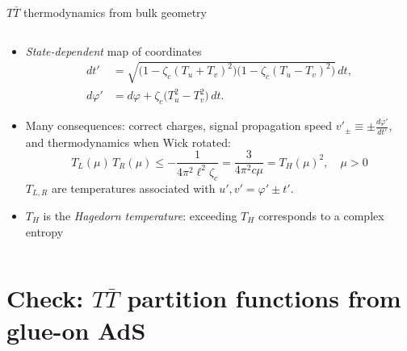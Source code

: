 \documentclass[
	10pt
	,noamsthm
]{beamer}
\newcommand{\TTbar}{\texorpdfstring{\ensuremath{T\bar{T}}}{TTbar}\xspace}
\begin{document}
\begin{frame}{\TTbar thermodynamics from bulk geometry}{%
	\textcite{Giveon:2017nie,Apolo:2019zai}
}
\begin{columns}
\begin{column}{\textwidth}
\vspace{-.3\baselineskip}
\begin{itemize}

\item \textit{State-dependent} map of coordinates
	\begin{align*}
		dt' &= \sqrt{ \big(1 - \zeta_c (T_u+T_v)^2 \big) \big(1 - \zeta_c (T_u-T_v)^2 \big) } \, dt, \\
		 d\varphi' &= d\varphi + \zeta_c \big( T_u^2 - T_v^2 \big)\,dt.
	\end{align*}

\pause
\item Many consequences: correct charges, signal propagation speed $v'_{\pm} \equiv \pm \frac{d\varphi'}{dt'}$, and thermodynamics when Wick rotated:
	\begin{equation}
		T_L(\mu)\,T_R(\mu) \le - \frac{1}{4\pi^2 \ell^2 \zeta_c} = \frac{3}{4\pi^2c\mu} = T_H(\mu)^2,
	\quad \mu > 0
	\end{equation}
	$T_{L,R}$ are temperatures associated with $u',v' = \varphi' \pm t'$.

\item $T_H$ is the \textit{Hagedorn temperature}: exceeding $T_H$ corresponds to a complex entropy
\end{itemize}
\end{column}
\end{columns}
\end{frame}

\section{\textbf{Check:} \TTbar partition functions from glue-on AdS} \label{se:partitionfunction}
\end{document}
